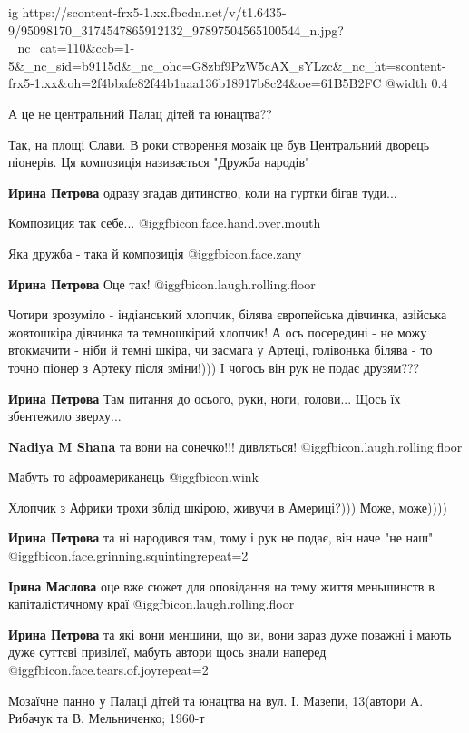  
 
 
 
 

\ifcmt
  ig https://scontent-frx5-1.xx.fbcdn.net/v/t1.6435-9/95098170_3174547865912132_97897504565100544_n.jpg?_nc_cat=110&ccb=1-5&_nc_sid=b9115d&_nc_ohc=G8zbf9PzW5cAX_sYLzc&_nc_ht=scontent-frx5-1.xx&oh=2f4bbafe82f44b1aaa136b18917b8c24&oe=61B5B2FC
  @width 0.4
\fi

А це не центральний Палац дітей та юнацтва??

Так, на площі Слави. В роки створення мозаік це був Центральний дворець піонерів. Ця композиція називається "Дружба народів"

\textbf{Ирина Петрова} одразу згадав дитинство, коли на гуртки бігав туди...

Композиция так себе... @igg{fbicon.face.hand.over.mouth} 

Яка дружба - така й композиція @igg{fbicon.face.zany} 

\textbf{Ирина Петрова} Оце так!  @igg{fbicon.laugh.rolling.floor} 


Чотири зрозуміло - індіанський хлопчик, білява європейська дівчинка, азійська
жовтошкіра дівчинка та темношкірий хлопчик! А ось посередині - не можу
втокмачити - ніби й темні шкіра, чи засмага у Артеці, голівонька білява - то
точно піонер з Артеку після зміни!))) І чогось він рук не подає друзям???

\textbf{Ирина Петрова} Там питання до осього, руки, ноги, голови... Щось їх збентежило зверху...

\textbf{Nadiya M Shana} та вони на сонечко!!! дивляться! @igg{fbicon.laugh.rolling.floor} 

Мабуть то афроамериканець @igg{fbicon.wink} 

Хлопчик з Африки трохи зблід шкірою, живучи в Америці?))) Може, може))))

\textbf{Ирина Петрова} та ні народився там, тому і рук не подає, він наче "не наш" @igg{fbicon.face.grinning.squinting}{repeat=2} 

\textbf{Ірина Маслова} оце вже сюжет для оповідання на тему життя меньшинств в капіталістичному краї  @igg{fbicon.laugh.rolling.floor} 

\textbf{Ирина Петрова} та які вони меншини, що ви, вони зараз дуже поважні і мають дуже суттєві привілеї, мабуть автори щось знали наперед @igg{fbicon.face.tears.of.joy}{repeat=2} 


Мозаїчне панно у Палаці дітей та юнацтва на вул. І. Мазепи, 13(автори А. Рибачук та В. Мельниченко; 1960-т
